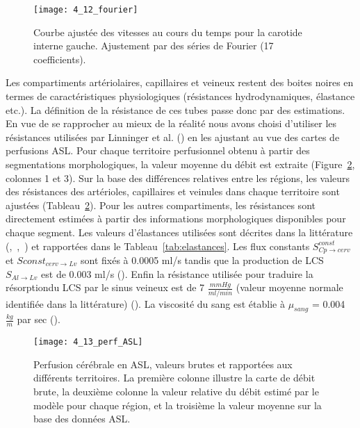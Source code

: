 \begin{figure}[!b]
\centering
\texttt{[image: 4\_12\_fourier]}
\caption{Courbe ajustée des vitesses au cours du temps pour la carotide interne gauche. Ajustement par des séries de
Fourier (17 coefficients).}
\label{fig:4_12_fourier}	
\end{figure}
Les compartiments artériolaires, capillaires et veineux restent des boites noires en termes de
caractéristiques physiologiques (résistances hydrodynamiques, élastance etc.). La définition de la
résistance de ces tubes passe donc par des estimations. En vue de se rapprocher au mieux de la réalité
nous avons choisi d’utiliser les résistances utilisées par Linninger et al. (\cite{Linninger2009}) en les ajustant au vue des cartes
de perfusions ASL. Pour chaque territoire perfusionnel obtenu à partir des segmentations
morphologiques, la valeur moyenne du débit est extraite (Figure~\ref{fig:4_13_perf_ASL}, colonnes 1 et 3). Sur la base des
différences relatives entre les régions, les valeurs des résistances des artérioles, capillaires et veinules
dans chaque territoire sont ajustées (Tableau~\ref{fig:4_13_perf_ASL}). Pour les autres compartiments, les résistances sont
directement estimées à partir des informations morphologiques disponibles pour chaque segment. Les
valeurs d’élastances utilisées sont décrites dans la littérature (\cite{Zagzoule1986},~\cite{Linninger2009},~\cite{Smillie2004}) et rapportées dans le
Tableau~\ref{tab:elastances}. Les flux constants $S^{const}_{Cp\rightarrow cerv}$ et $S{const}_{cerv\rightarrow Lv}$ sont fixés à 0.0005 ml/s tandis que la
production de LCS $S_{Al\rightarrow Lv}$ est de 0.003 ml/s (\cite{Linninger2009}). Enfin la résistance utilisée pour traduire la résorptiondu LCS par le sinus veineux est de 7 $\frac{mmHg}{ ml/min}$ (valeur moyenne normale identifiée dans la littérature) (\cite{Ekstedt1978}). La viscosité du sang est établie à $\mu_{sang}$ = 0.004 $\frac{kg}{ m}$ par sec (\cite{Pedley1980}).\\
\begin{figure}[!t]
\centering
\texttt{[image: 4\_13\_perf\_ASL]}
\caption{Perfusion cérébrale en ASL, valeurs brutes et rapportées aux différents territoires. La première colonne illustre la
carte de débit brute, la deuxième colonne la valeur relative du débit estimé par le modèle pour chaque région, et la troisième
la valeur moyenne sur la base des données ASL.}
\label{fig:4_13_perf_ASL}	
\end{figure}

